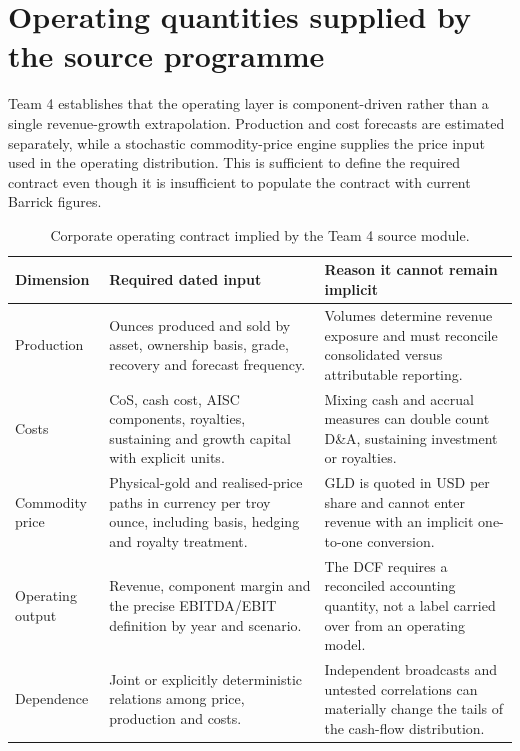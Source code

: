 
\section{Operating quantities supplied by the source programme}

Team 4 establishes that the operating layer is component-driven rather than a
single revenue-growth extrapolation. Production and cost forecasts are
estimated separately, while a stochastic commodity-price engine supplies the
price input used in the operating distribution. This is sufficient to define
the required contract even though it is insufficient to populate the contract
with current Barrick figures.

\begin{table}[H]
\centering
\caption{Corporate operating contract implied by the Team 4 source module.}
\label{tab:company-operating-contract}
\small
\renewcommand{\arraystretch}{1.12}
\begin{tabularx}{\textwidth}{@{}p{2.70cm}X X@{}}
\toprule
\textbf{Dimension} & \textbf{Required dated input} &
\textbf{Reason it cannot remain implicit} \\
\midrule
Production & Ounces produced and sold by asset, ownership basis, grade,
recovery and forecast frequency. & Volumes determine revenue exposure and
must reconcile consolidated versus attributable reporting. \\
Costs & CoS, cash cost, AISC components, royalties, sustaining and growth
capital with explicit units. & Mixing cash and accrual measures can double
count D\&A, sustaining investment or royalties. \\
Commodity price & Physical-gold and realised-price paths in currency per troy
ounce, including basis, hedging and royalty treatment. & GLD is quoted in USD
per share and cannot enter revenue with an implicit one-to-one conversion. \\
Operating output & Revenue, component margin and the precise EBITDA/EBIT
definition by year and scenario. & The DCF requires a reconciled accounting
quantity, not a label carried over from an operating model. \\
Dependence & Joint or explicitly deterministic relations among price,
production and costs. & Independent broadcasts and untested correlations can
materially change the tails of the cash-flow distribution. \\
\bottomrule
\end{tabularx}
\end{table}

